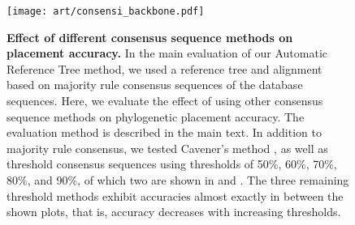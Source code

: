 \begin{figure}[hpbt]
    \centering
    \texttt{[image: art/consensi\_backbone.pdf]}
    \begin{subfigure}{0pt}
        \label{fig:consensi_backbone:sub:majorities}
    \end{subfigure}
    \begin{subfigure}{0pt}
        \label{fig:consensi_backbone:sub:cavener}
    \end{subfigure}
    \begin{subfigure}{0pt}
        \label{fig:consensi_backbone:sub:50_threshold}
    \end{subfigure}
    \begin{subfigure}{0pt}
        \label{fig:consensi_backbone:sub:90_threshold}
    \end{subfigure}
    \caption[Effect of different consensus sequence methods on placement accuracy]{
        \textbf{Effect of different consensus sequence methods on placement accuracy.}
        In the main evaluation of our Automatic Reference Tree method,
        we used a reference tree and alignment based on majority rule consensus sequences \citep{May1952,Day1992a}
        of the  database sequences.
        Here, we evaluate the effect of using other consensus sequence methods
        on phylogenetic placement accuracy.
        The evaluation method is described in the main text.
        In addition to  majority rule consensus, we tested
         Cavener's method \citep{Cavener1987,Cavener1991a},
        as well as threshold consensus sequences \citep{Day1992a,Day1992}
        using thresholds of 50\%, 60\%, 70\%, 80\%, and 90\%, of which two are shown in
         and .
        The three remaining threshold methods exhibit accuracies almost exactly in between the shown plots,
        that is, accuracy decreases with increasing thresholds.
}
\end{figure}
